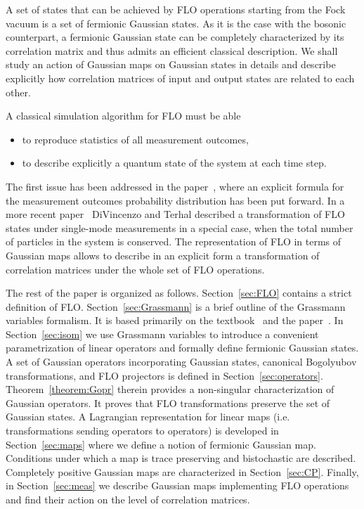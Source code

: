 \documentclass[twocolumn,showpacs,preprintnumbers,superscriptaddress]{revtex4}
\begin{document}
A set of states that can be
achieved by FLO operations starting from the Fock vacuum is a 
set of fermionic Gaussian states. As it is the case with the bosonic counterpart,
a fermionic Gaussian state can be completely characterized by 
its correlation matrix and thus admits an efficient classical description.          
We shall study an action of Gaussian maps on Gaussian states in details
and describe explicitly how correlation matrices of input and output states
are related to each other. 

A classical simulation algorithm for FLO must be able 
\begin{itemize}
\item
to reproduce statistics of all measurement outcomes, 

\item 
to describe explicitly  a quantum state of the system at each time step. 
\end{itemize}
The first issue has been addressed in the paper~\cite{TV01},
where an explicit formula for the measurement outcomes
probability distribution has been put forward. 
In a more recent paper~\cite{TV04} DiVincenzo and Terhal described a transformation
of FLO states under single-mode measurements in a special case,
when the total number of particles in the system is conserved.
The representation of FLO in terms of Gaussian maps
allows to describe in an explicit form
a transformation of correlation matrices under the whole set of FLO operations.



The rest of the paper is organized as follows. Section~\ref{sec:FLO} contains
a strict definition of FLO.
Section~\ref{sec:Grassmann}
is a brief outline  of  the Grassmann variables formalism. It is
based primarily on the textbook~\cite{DiFrancesco} and the paper~\cite{Soper78}.
In Section~\ref{sec:isom} we use Grassmann variables to introduce
a convenient parametrization of linear operators and formally define
fermionic Gaussian states.
A set of Gaussian operators incorporating Gaussian states, canonical
Bogolyubov transformations, and FLO projectors is defined in Section~\ref{sec:operators}.
Theorem~\ref{theorem:Gopr} therein provides a non-singular characterization
of Gaussian operators. It proves that FLO transformations preserve the set
of Gaussian states. 
A Lagrangian representation for linear maps (i.e. transformations sending 
operators to operators)  is developed in Section~\ref{sec:maps}
where we define a notion of fermionic Gaussian map.  Conditions under which a
map is trace preserving and bistochastic are described. 
Completely positive Gaussian maps are characterized in Section~\ref{sec:CP}.
Finally, in Section~\ref{sec:meas} we describe Gaussian maps implementing
FLO operations and find their action on the level of correlation matrices.
\end{document}
